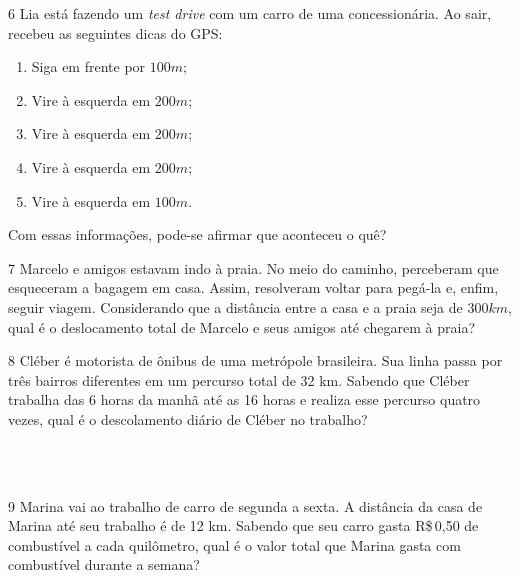 

\num{6} Lia está fazendo um \textit{test drive} com um carro de uma concessionária. Ao
sair, recebeu as seguintes dicas do GPS:

\begin{enumerate}[itemsep=0pt]
\item Siga em frente por $100 m$;
\item Vire à esquerda em $200 m$;
\item Vire à esquerda em $200 m$;
\item Vire à esquerda em $200 m$;
\item Vire à esquerda em $100 m$.
\end{enumerate}

Com essas informações, pode-se afirmar que aconteceu o quê?


\num{7} Marcelo e amigos estavam indo à praia. No meio do caminho,
perceberam que esqueceram a bagagem em casa. Assim, resolveram voltar
para pegá-la e, enfim, seguir viagem.
Considerando que a distância entre a casa e a praia seja de $300 km$, qual
é o deslocamento total de Marcelo e seus amigos até chegarem à praia?



\num{8} Cléber é motorista de ônibus de uma metrópole brasileira. Sua linha
passa por três bairros diferentes em um percurso total de 32 km. Sabendo que
Cléber trabalha das 6 horas da manhã até as 16 horas e realiza esse
percurso quatro vezes, qual é o descolamento diário de Cléber no trabalho?

\\
\\

\num{9} Marina vai ao trabalho de carro de segunda a sexta. A distância da
casa de Marina até seu trabalho é de 12 km. Sabendo que seu carro gasta
R\$\,0,50 de combustível a cada quilômetro, qual é o valor total que Marina
gasta com combustível durante a semana?


